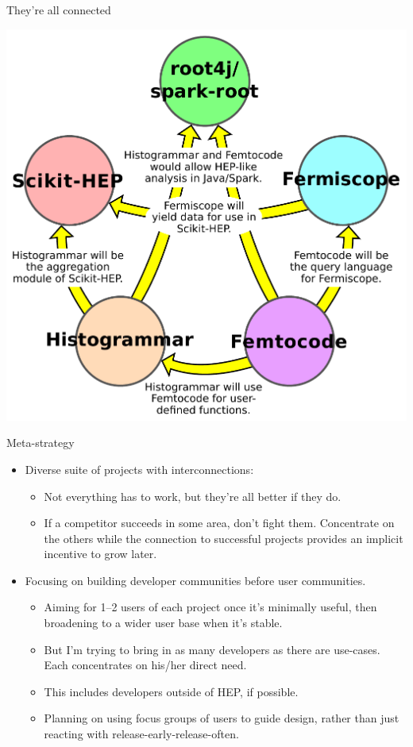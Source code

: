 \documentclass{beamer}
\begin{document}
\begin{frame}{They're all connected}
\begin{center}
\includegraphics[width=0.8\linewidth]{relationships.pdf}
\end{center}
\end{frame}

\begin{frame}{Meta-strategy}
\vspace{0.25 cm}
\begin{itemize}
\item Diverse suite of projects with interconnections:
\begin{itemize}
\item Not everything has to work, but they're all better if they do.
\item If a competitor succeeds in some area, don't fight them. Concentrate on the others while the connection to successful projects provides an implicit incentive to grow later.
\end{itemize}

\item Focusing on building developer communities before user communities.
\begin{itemize}
\item Aiming for 1--2 users of each project once it's minimally useful, then broadening to a wider user base when it's stable.
\item But I'm trying to bring in as many developers as there are use-cases. Each concentrates on his/her direct need.
\item This includes developers outside of HEP, if possible.
\item Planning on using focus groups of users to guide design, rather than just reacting with release-early-release-often.
\end{itemize}
\end{itemize}
\end{frame}
\end{document}
